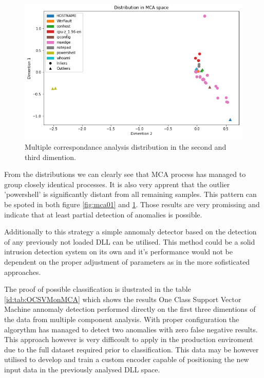 \documentclass[a4paper,twoside,12pt]{book}
\begin{document}
 \begin{figure}
	\centering
	\includegraphics[scale=0.9]{images/MCA12}
	\caption{Multiple correspondance analysis distribution in the second and third dimention.}
	\label{fig:mca12}
 \end{figure}

From the distributions we can clearly see that MCA process has managed to group closely identical processes.
It is also very apprent that the outlier 'powershell' is significantly distant from all remaining samples. 
This pattern can be spoted in both figure \ref{fig:mca01} and \ref{fig:mca12}. Those results are very 
promissing and indicate that at least partial detection of anomalies is possible. 

Additionally to this strategy a simple annomaly detector based on the detection of any previously not loaded
DLL can be utilised. This method could be a solid intrusion detection system on its own and it's performance
would not be dependent on the proper adjustment of parameters as in the more sofisticated approaches.



The proof of possible classification is ilustrated in the table \ref{id:tab:OCSVMonMCA} which shows the 
results One Class Support Vector Machine annomaly detection performed directly on the first three dimentions 
of the data from multiple component analysis. With proper configuration the algorythm has managed to detect 
two anomalies with zero false negative results. This approach however is very difficoult to apply in the 
production enviroment due to the full dataset required prior to classification. This data may be however 
utilised to develop and train a custom encoder capable of positioning the new input data in the previously 
analysed DLL space.  
\end{document}
